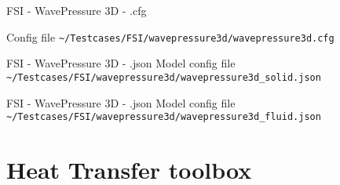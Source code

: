 \begin{frame}{FSI - WavePressure 3D - .cfg}

Config file \lstinline{~/Testcases/FSI/wavepressure3d/wavepressure3d.cfg}

\vspace{5mm}


\end{frame}


\begin{frame}{FSI - WavePressure 3D - .json}
Model config file \lstinline{~/Testcases/FSI/wavepressure3d/wavepressure3d_solid.json}
\vspace{5mm}

\end{frame}


\begin{frame}{FSI - WavePressure 3D - .json}
Model config file \lstinline{~/Testcases/FSI/wavepressure3d/wavepressure3d_fluid.json}
\vspace{5mm}

\end{frame}



\section[HeatTransfer]{Heat Transfer toolbox}







